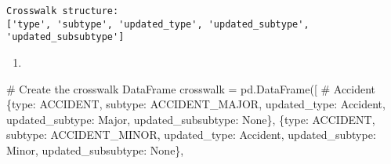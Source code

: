 \documentclass[
  letterpaper,
  DIV=11,
  numbers=noendperiod]{scrartcl}
\newenvironment{Shaded}{\begin{snugshade}}{\end{snugshade}}
\newcommand{\CommentTok}[1]{\textcolor[rgb]{0.37,0.37,0.37}{#1}}
\newcommand{\NormalTok}[1]{\textcolor[rgb]{0.00,0.23,0.31}{#1}}
\newcommand{\OperatorTok}[1]{\textcolor[rgb]{0.37,0.37,0.37}{#1}}
\newcommand{\StringTok}[1]{\textcolor[rgb]{0.13,0.47,0.30}{#1}}
\newcommand{\VariableTok}[1]{\textcolor[rgb]{0.07,0.07,0.07}{#1}}
\providecommand{\tightlist}{%
  \setlength{\itemsep}{0pt}\setlength{\parskip}{0pt}}\usepackage{longtable,booktabs,array}
\begin{document}
\begin{verbatim}
Crosswalk structure:
['type', 'subtype', 'updated_type', 'updated_subtype', 'updated_subsubtype']
\end{verbatim}

\begin{enumerate}
\def\labelenumi{\arabic{enumi}.}
\setcounter{enumi}{1}
\tightlist
\item
\end{enumerate}

\begin{Shaded}
\begin{Highlighting}[]
\CommentTok{\# Create the crosswalk DataFrame}
\NormalTok{crosswalk }\OperatorTok{=}\NormalTok{ pd.DataFrame([}
    \CommentTok{\# Accident}
\NormalTok{    \{}\StringTok{\textquotesingle{}type\textquotesingle{}}\NormalTok{: }\StringTok{\textquotesingle{}ACCIDENT\textquotesingle{}}\NormalTok{, }\StringTok{\textquotesingle{}subtype\textquotesingle{}}\NormalTok{: }\StringTok{\textquotesingle{}ACCIDENT\_MAJOR\textquotesingle{}}\NormalTok{, }
     \StringTok{\textquotesingle{}updated\_type\textquotesingle{}}\NormalTok{: }\StringTok{\textquotesingle{}Accident\textquotesingle{}}\NormalTok{, }\StringTok{\textquotesingle{}updated\_subtype\textquotesingle{}}\NormalTok{: }\StringTok{\textquotesingle{}Major\textquotesingle{}}\NormalTok{, }\StringTok{\textquotesingle{}updated\_subsubtype\textquotesingle{}}\NormalTok{: }\VariableTok{None}\NormalTok{\},}
\NormalTok{    \{}\StringTok{\textquotesingle{}type\textquotesingle{}}\NormalTok{: }\StringTok{\textquotesingle{}ACCIDENT\textquotesingle{}}\NormalTok{, }\StringTok{\textquotesingle{}subtype\textquotesingle{}}\NormalTok{: }\StringTok{\textquotesingle{}ACCIDENT\_MINOR\textquotesingle{}}\NormalTok{, }
     \StringTok{\textquotesingle{}updated\_type\textquotesingle{}}\NormalTok{: }\StringTok{\textquotesingle{}Accident\textquotesingle{}}\NormalTok{, }\StringTok{\textquotesingle{}updated\_subtype\textquotesingle{}}\NormalTok{: }\StringTok{\textquotesingle{}Minor\textquotesingle{}}\NormalTok{, }\StringTok{\textquotesingle{}updated\_subsubtype\textquotesingle{}}\NormalTok{: }\VariableTok{None}\NormalTok{\},}
    

\end{Highlighting}
\end{Shaded}
\end{document}
